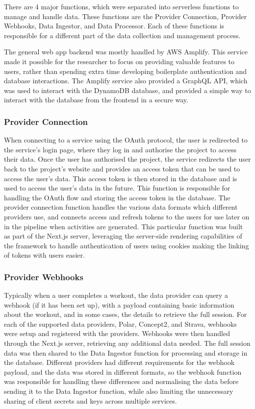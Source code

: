 There are 4 major functions, which were separated into serverless functions to manage and handle data. These functions are the Provider Connection, Provider Webhooks, Data Ingestor, and Data Processor. Each of these functions is responsible for a different part of the data collection and management process.

The general web app backend was mostly handled by AWS Amplify. This service made it possible for the researcher to focus on providing valuable features to users, rather than spending extra time developing boilerplate authentication and database interactions. The Amplify service also provided a GraphQL API, which was used to interact with the DynamoDB database, and provided a simple way to interact with the database from the frontend in a secure way.

\subsubsection{Provider Connection}
When connecting to a service using the OAuth protocol, the user is redirected to the service's login page, where they log in and authorise the project to access their data. Once the user has authorised the project, the service redirects the user back to the project's website and provides an access token that can be used to access the user's data. This access token is then stored in the database and is used to access the user's data in the future. This function is responsible for handling the OAuth flow and storing the access token in the database. The provider connection function handles the various data formats which different providers use, and connects access and refresh tokens to the users for use later on in the pipeline when activities are generated. This particular function was built as part of the Next.js server, leveraging the server-side rendering capabilities of the framework to handle authentication of users using cookies making the linking of tokens with users easier.

\subsubsection{Provider Webhooks}
Typically when a user completes a workout, the data provider can query a webhook (if it has been set up), with a payload containing basic information about the workout, and in some cases, the details to retrieve the full session. For each of the supported data providers, Polar, Concept2, and Strava, webhooks were setup and registered with the providers. Webhooks were then handled through the Next.js server, retrieving any additional data needed. The full session data was then shared to the Data Ingestor function for processing and storage in the database. Different providers had different requirements for the webhook payload, and the data was stored in different formats, so the webhook function was responsible for handling these differences and normalising the data before sending it to the Data Ingestor function, while also limiting the unnecessary sharing of client secrets and keys across multiple services.

